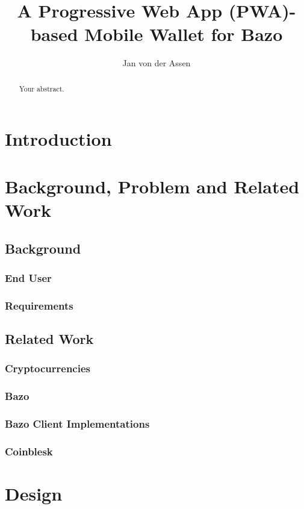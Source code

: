 \documentclass[a4paper]{article}
\title{A Progressive Web App (PWA)-based Mobile Wallet for Bazo}
\author{Jan von der Assen}
\begin{document}
\maketitle

\begin{abstract}
  Your abstract.
\end{abstract}
\tableofcontents
\newpage


\section{Introduction}

\section{Background, Problem and Related Work}
\subsection{Background}
\subsubsection{End User}
\subsubsection{Requirements}

\subsection{Related Work}
\subsubsection{Cryptocurrencies}
\subsubsection{Bazo}
\subsubsection{Bazo Client Implementations}
\subsubsection{Coinblesk}



\section{Design}
\end{document}
